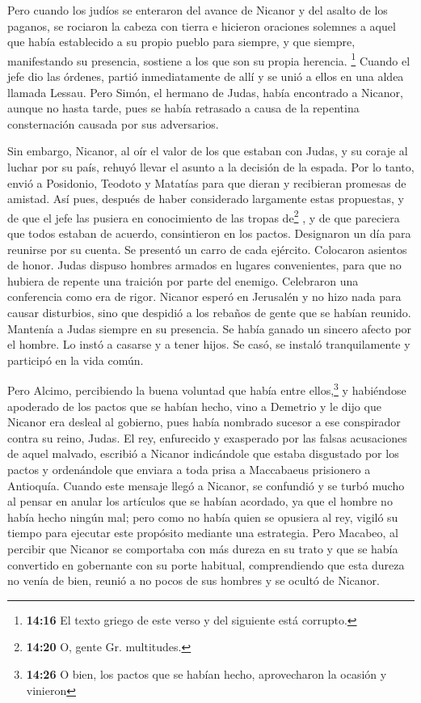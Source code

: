  Pero cuando los judíos se enteraron del avance de
Nicanor y del asalto de los paganos, se rociaron la cabeza con tierra e
hicieron oraciones solemnes a aquel que había establecido a su propio
pueblo para siempre, y que siempre, manifestando su presencia, sostiene
a los que son su propia herencia.  \footnote{\textbf{14:16}
  El texto griego de este verso y del siguiente está corrupto.} Cuando
el jefe dio las órdenes, partió inmediatamente de allí y se unió a ellos
en una aldea llamada Lessau.  Pero Simón, el hermano de
Judas, había encontrado a Nicanor, aunque no hasta tarde, pues se había
retrasado a causa de la repentina consternación causada por sus
adversarios.

 Sin embargo, Nicanor, al oír el valor de los que estaban
con Judas, y su coraje al luchar por su país, rehuyó llevar el asunto a
la decisión de la espada.  Por lo tanto, envió a
Posidonio, Teodoto y Matatías para que dieran y recibieran promesas de
amistad.  Así pues, después de haber considerado
largamente estas propuestas, y de que el jefe las pusiera en
conocimiento de las tropas de\footnote{\textbf{14:20} O, gente Gr.
  multitudes.} , y de que pareciera que todos estaban de acuerdo,
consintieron en los pactos.  Designaron un día para
reunirse por su cuenta. Se presentó un carro de cada ejército. Colocaron
asientos de honor.  Judas dispuso hombres armados en
lugares convenientes, para que no hubiera de repente una traición por
parte del enemigo. Celebraron una conferencia como era de rigor.
 Nicanor esperó en Jerusalén y no hizo nada para causar
disturbios, sino que despidió a los rebaños de gente que se habían
reunido.  Mantenía a Judas siempre en su presencia. Se
había ganado un sincero afecto por el hombre.  Lo instó a
casarse y a tener hijos. Se casó, se instaló tranquilamente y participó
en la vida común.

 Pero Alcimo, percibiendo la buena voluntad que había
entre ellos,\footnote{\textbf{14:26} O bien, los pactos que se habían
  hecho, aprovecharon la ocasión y vinieron} y habiéndose apoderado de
los pactos que se habían hecho, vino a Demetrio y le dijo que Nicanor
era desleal al gobierno, pues había nombrado sucesor a ese conspirador
contra su reino, Judas.  El rey, enfurecido y exasperado
por las falsas acusaciones de aquel malvado, escribió a Nicanor
indicándole que estaba disgustado por los pactos y ordenándole que
enviara a toda prisa a Maccabaeus prisionero a Antioquía.
 Cuando este mensaje llegó a Nicanor, se confundió y se
turbó mucho al pensar en anular los artículos que se habían acordado, ya
que el hombre no había hecho ningún mal;  pero como no
había quien se opusiera al rey, vigiló su tiempo para ejecutar este
propósito mediante una estrategia.  Pero Macabeo, al
percibir que Nicanor se comportaba con más dureza en su trato y que se
había convertido en gobernante con su porte habitual, comprendiendo que
esta dureza no venía de bien, reunió a no pocos de sus hombres y se
ocultó de Nicanor.

